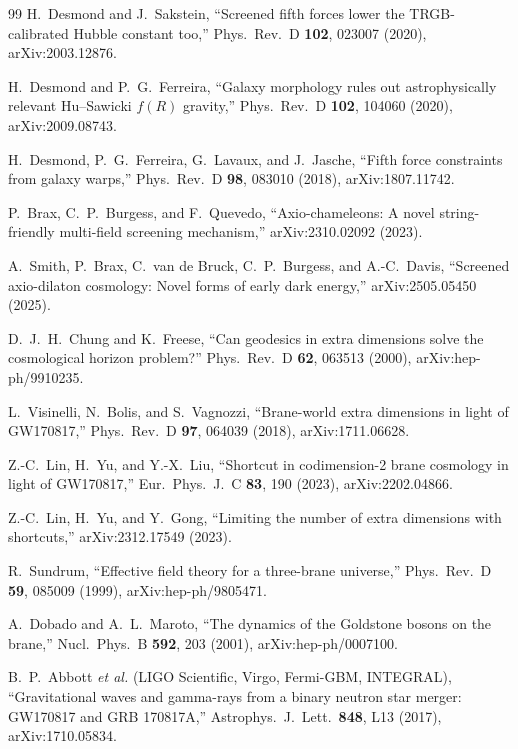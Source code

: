 \documentclass[aps,prd,reprint,superscriptaddress,nofootinbib,floatfix]{revtex4-2}
\theoremstyle{definition}
\begin{document}
\begin{thebibliography}{99}
 H.~Desmond and J.~Sakstein, ``Screened fifth forces lower the TRGB-calibrated Hubble constant too,'' Phys.\ Rev.\ D \textbf{102}, 023007 (2020), arXiv:2003.12876.

 H.~Desmond and P.~G.~Ferreira, ``Galaxy morphology rules out astrophysically relevant Hu--Sawicki $f(R)$ gravity,'' Phys.\ Rev.\ D \textbf{102}, 104060 (2020), arXiv:2009.08743.

 H.~Desmond, P.~G.~Ferreira, G.~Lavaux, and J.~Jasche, ``Fifth force constraints from galaxy warps,'' Phys.\ Rev.\ D \textbf{98}, 083010 (2018), arXiv:1807.11742.

 P.~Brax, C.~P.~Burgess, and F.~Quevedo, ``Axio-chameleons: A novel string-friendly multi-field screening mechanism,'' arXiv:2310.02092 (2023).

 A.~Smith, P.~Brax, C.~van de Bruck, C.~P.~Burgess, and A.-C.~Davis, ``Screened axio-dilaton cosmology: Novel forms of early dark energy,'' arXiv:2505.05450 (2025).

 D.~J.~H.~Chung and K.~Freese, ``Can geodesics in extra dimensions solve the cosmological horizon problem?'' Phys.\ Rev.\ D \textbf{62}, 063513 (2000), arXiv:hep-ph/9910235.

 L.~Visinelli, N.~Bolis, and S.~Vagnozzi, ``Brane-world extra dimensions in light of GW170817,'' Phys.\ Rev.\ D \textbf{97}, 064039 (2018), arXiv:1711.06628.

 Z.-C.~Lin, H.~Yu, and Y.-X.~Liu, ``Shortcut in codimension-2 brane cosmology in light of GW170817,'' Eur.\ Phys.\ J.\ C \textbf{83}, 190 (2023), arXiv:2202.04866.

 Z.-C.~Lin, H.~Yu, and Y.~Gong, ``Limiting the number of extra dimensions with shortcuts,'' arXiv:2312.17549 (2023).

 R.~Sundrum, ``Effective field theory for a three-brane universe,'' Phys.\ Rev.\ D \textbf{59}, 085009 (1999), arXiv:hep-ph/9805471.

 A.~Dobado and A.~L.~Maroto, ``The dynamics of the Goldstone bosons on the brane,'' Nucl.\ Phys.\ B \textbf{592}, 203 (2001), arXiv:hep-ph/0007100.

 B.~P.~Abbott \emph{et al.} (LIGO Scientific, Virgo, Fermi-GBM, INTEGRAL), ``Gravitational waves and gamma-rays from a binary neutron star merger: GW170817 and GRB 170817A,'' Astrophys.\ J.\ Lett.\ \textbf{848}, L13 (2017), arXiv:1710.05834.


\end{thebibliography}
\end{document}
